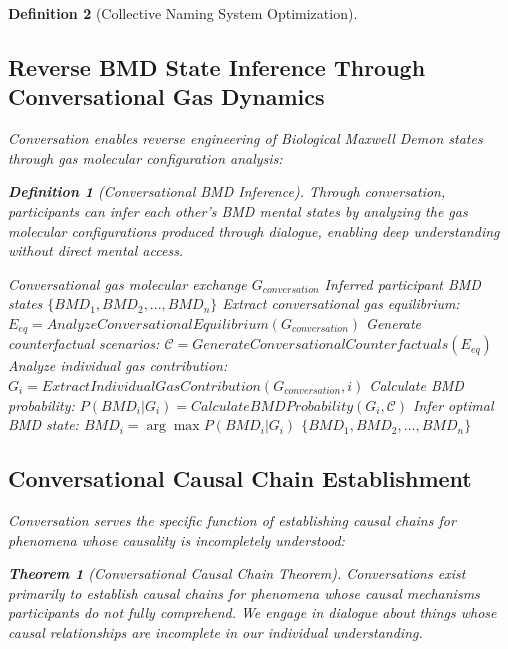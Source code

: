 \documentclass[12pt]{article}
\newtheorem{theorem}{Theorem}
\newtheorem{definition}{Definition}
\begin{document}
\begin{definition}[Collective Naming System Optimization]
\subsection{Reverse BMD State Inference Through Conversational Gas Dynamics}

Conversation enables reverse engineering of Biological Maxwell Demon states through gas molecular configuration analysis:

\begin{definition}[Conversational BMD Inference]
Through conversation, participants can infer each other's BMD mental states by analyzing the gas molecular configurations produced through dialogue, enabling deep understanding without direct mental access.
\end{definition}

\begin{algorithm}[H]
\caption{Conversational BMD State Inference}
\begin{algorithmic}[1]
\REQUIRE Conversational gas molecular exchange $G_{conversation}$
\ENSURE Inferred participant BMD states $\{BMD_1, BMD_2, ..., BMD_n\}$
\STATE Extract conversational gas equilibrium: $E_{eq} = AnalyzeConversationalEquilibrium(G_{conversation})$
\STATE Generate counterfactual scenarios: $\mathcal{C} = GenerateConversationalCounterfactuals(E_{eq})$
    \STATE Analyze individual gas contribution: $G_i = ExtractIndividualGasContribution(G_{conversation}, i)$
    \STATE Calculate BMD probability: $P(BMD_i | G_i) = CalculateBMDProbability(G_i, \mathcal{C})$
    \STATE Infer optimal BMD state: $BMD_i = \arg\max P(BMD_i | G_i)$
\ENDFOR
\RETURN $\{BMD_1, BMD_2, ..., BMD_n\}$
\end{algorithmic}
\end{algorithm}

\subsection{Conversational Causal Chain Establishment}

Conversation serves the specific function of establishing causal chains for phenomena whose causality is incompletely understood:

\begin{theorem}[Conversational Causal Chain Theorem]
Conversations exist primarily to establish causal chains for phenomena whose causal mechanisms participants do not fully comprehend. We engage in dialogue about things whose causal relationships are incomplete in our individual understanding.
\end{theorem}


\end{definition}
\end{document}
